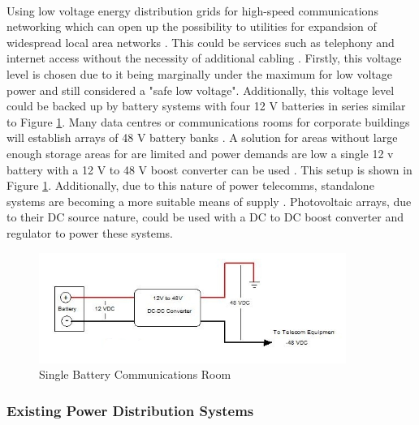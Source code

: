 \paragraph{}
Using low voltage energy distribution grids for high-speed communications networking which can open up the possibility to utilities for expandsion of widespread local area networks \cite{Waldeck1998}. This could be services such as telephony and internet access without the necessity of additional cabling \cite{Waldeck1998}. Firstly, this voltage level is chosen due to it being marginally under the maximum for low voltage power and still considered a "safe low voltage". Additionally, this voltage level could be backed up by battery systems with four 12 \si{V} batteries in series similar to Figure \ref{fig:48VTelecomms}. Many data centres or communications rooms for corporate buildings will establish arrays of 48 \si{V} battery banks \cite{website:48VTelecomms}. A solution for areas without large enough storage areas for are limited and power demands are low a single 12 \si{v} battery with a 12 \si{V} to 48 \si{V} boost converter can be used \cite{website:48VTelecomms}. This setup is shown in Figure \ref{fig:48VTelecomms}. Additionally, due to this nature of power telecomms, standalone systems are becoming a more suitable means of supply \cite{Ribeiro2009}. Photovoltaic arrays, due to their DC source nature, could be used with a DC to DC boost converter and regulator to power these systems.   

\begin{figure}[H]
\hfill\includegraphics[width = 100mm]{images/12V_Telecomms}\hspace*{\fill}
\caption{Single Battery Communications Room \cite{website:48VTelecomms}}
\label{fig:48VTelecomms}
\end{figure}   

\subsubsection{Existing Power Distribution Systems}

